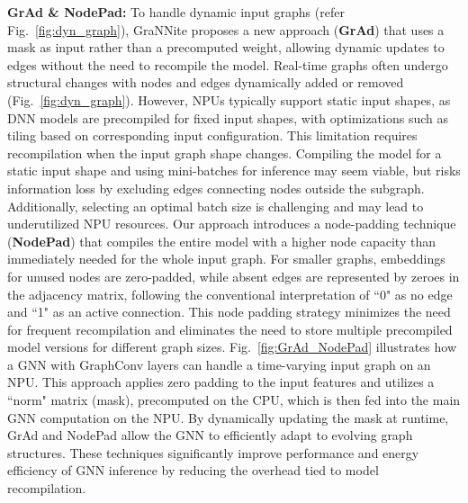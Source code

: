 \textbf{GrAd \& NodePad:} To handle dynamic input graphs (refer Fig.~\ref{fig:dyn_graph}), GraNNite proposes a new approach (\textbf{GrAd}) that uses a mask as input rather than a precomputed weight, allowing dynamic updates to edges without the need to recompile the model.
Real-time graphs often undergo structural changes with nodes and edges dynamically added or removed (Fig.~\ref{fig:dyn_graph}). However, NPUs typically support static input shapes, as DNN models are precompiled for fixed input shapes, with optimizations such as tiling based on corresponding input configuration. This limitation requires recompilation when the input graph shape changes.
Compiling the model for a static input shape and using mini-batches for inference may seem viable, but risks information loss by excluding edges connecting nodes outside the subgraph. Additionally, selecting an optimal batch size is challenging and may lead to underutilized NPU resources.
Our approach introduces a node-padding technique (\textbf{NodePad}) that compiles the entire model with a higher node capacity than immediately needed for the whole input graph. For smaller graphs, embeddings for unused nodes are zero-padded, while absent edges are represented by zeroes in the adjacency matrix, following the conventional interpretation of ``0" as no edge and ``1" as an active connection. This node padding strategy minimizes the need for frequent recompilation and eliminates the need to store multiple precompiled model versions for different graph sizes. Fig.~\ref{fig:GrAd_NodePad} illustrates how a GNN with GraphConv layers can handle a time-varying input graph on an NPU. This approach applies zero padding to the input features and utilizes a ``norm" matrix (mask), precomputed on the CPU, which is then fed into the main GNN computation on the NPU. By dynamically updating the mask at runtime, GrAd and NodePad allow the GNN to efficiently adapt to evolving graph structures. These techniques significantly improve performance and energy efficiency of GNN inference by reducing the overhead tied to model recompilation.

